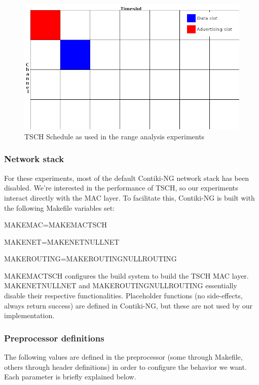 \documentclass[conference]{IEEEtran}
\renewcommand\_{\textunderscore\allowbreak}
\begin{document}
\begin{figure}[htbp]
	\centering
	\includegraphics[width=.4\textwidth,keepaspectratio]{figures/tsch_schedule.png}
	\caption{TSCH Schedule as used in the range analysis experiments}
	\label{fig:TSCHSchedule}
\end{figure}

\subsubsection{Network stack}
\label{section:netstack}

For these experiments, most of the default Contiki-NG network stack has been disabled. We're interested in the performance of TSCH, so our experiments interact directly with the MAC layer. To facilitate this, Contiki-NG is built with the following Makefile variables set: 
\begin{itemize}
{
\small
\item MAKE\_MAC=MAKE\_MAC\_TSCH
\item MAKE\_NET=MAKE\_NET\_NULLNET
\item MAKE\_ROUTING=MAKE\_ROUTING\_NULLROUTING
}
\end{itemize}

MAKE\_MAC\_TSCH configures the build system to build the TSCH MAC layer. MAKE\_NET\_NULLNET and MAKE\_ROUTING\_NULLROUTING essentially disable their respective functionalities. Placeholder functions (no side-effects, always return success) are defined in Contiki-NG, but these are not used by our implementation. 

\subsubsection{Preprocessor definitions}

The following values are defined in the preprocessor (some through Makefile, others through header definitions) in order to configure the behavior we want. Each parameter is briefly explained below.
\end{document}
